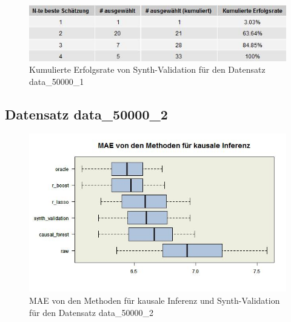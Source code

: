 \documentclass[12pt,a4paper,twoside]{scrartcl}
\numberwithin{equation}{section}
\newcounter{mypagecount}%
\newenvironment{interlude}{%
  \clearpage
  \setcounter{mypagecount}{\value{page}}%
  \thispagestyle{empty}%
  \pagestyle{empty}%
}{%
  \clearpage
  \setcounter{page}{\value{mypagecount}}%
}
\begin{document}
\begin{interlude}
\begin{appendices}
\begin{center}
\begin{figure}[H]
    \centering
    \includegraphics[height=0.2\textwidth, width=1\textwidth]{figures/plots/appendix/rawData50000aGrid.jpeg}
    \vspace{1mm}
    \caption[Kumulierte Erfolgsrate von Synth-Validation für den Datensatz data\_50000\_1]{Kumulierte Erfolgsrate von Synth-Validation für den Datensatz data\_50000\_1}
  \end{figure}
\end{center}

\subsection{Datensatz data\_50000\_2}

\begin{center}
\begin{figure}[H]
    \centering
    \includegraphics[height=0.5\textwidth, width=1\textwidth]{figures/plots/appendix/rawData50000bBoxplot.jpeg}
    \caption[MAE von den Methoden für kausale Inferenz und Synth-Validation für den Datensatz data\_50000\_2]{MAE von den Methoden für kausale Inferenz und Synth-Validation für den Datensatz data\_50000\_2}
  \end{figure}
\end{center}


\end{appendices}
\end{interlude}
\end{document}
